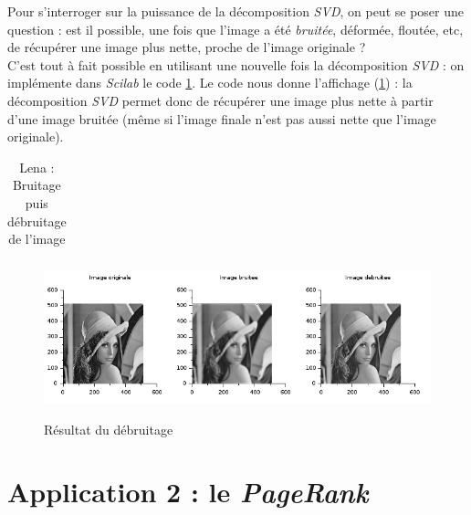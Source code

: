\documentclass[a4paper,10pt]{report}
\begin{document}
\indent Pour s'interroger sur la puissance de la décomposition \textit{SVD}, on peut se poser une question : est il possible, une fois que l'image a été \textit{bruitée}, déformée, floutée, etc, de récupérer une image plus nette, proche de l'image originale ? \\
\indent C'est tout à fait possible en utilisant une nouvelle fois la décomposition \textit{SVD} : on implémente dans \textit{Scilab} le code \ref{lena_bis}. Le code nous donne l'affichage (\ref{decompression}) : la décomposition \textit{SVD} permet donc de récupérer une image plus nette à partir d'une image bruitée (même si l'image finale n'est pas aussi nette que l'image originale).
\begin{table}[H]
\caption{Lena : Bruitage puis débruitage de l'image}
\begin{tabular}{l}

\label{lena_bis}
\end{tabular}
\end{table}

\begin{figure}[H]
\centering
\caption{Résultat du débruitage}
\includegraphics[width=\textwidth]{lena_pg2.png}
\label{decompression}
\end{figure}


\section{Application 2 : le \textit{PageRank}}
\end{document}
